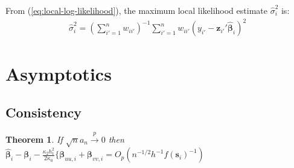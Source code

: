\documentclass[authoryear, review, 11pt]{elsarticle}
\newtheorem{theorem}{Theorem}[section]
\begin{document}
  From (\ref{eq:local-log-likelihood}), the maximum local likelihood estimate $\hat{\sigma}_i^2$ is:	 
  \begin{align}
    \hat{\sigma}_i^2 = \left(\sum \limits_{i'=1}^{n} w_{ii'} \right)^{-1} \sum \limits_{i'=1}^n w_{ii'}\left(y_{i'} - \bm{z}_{i'}'\hat{\bm{\beta}}_i\right)^2
  \end{align}
  
  
\section{Asymptotics}
  \subsection{Consistency}
  \begin{theorem}    
    If $\sqrt{n} a_n \xrightarrow{p} 0$ then $\hat{\bm{\beta}}_i - \bm{\beta}_i -  \frac{\kappa_2 h_1^2}{2 \kappa_0} \{ \bm{\beta}_{uu,i} + \bm{\beta}_{vv,i} = O_p(n^{-1/2} h^{-1} f(\bm{s}_i)^{-1} )$
  \end{theorem}
  
\end{document}
